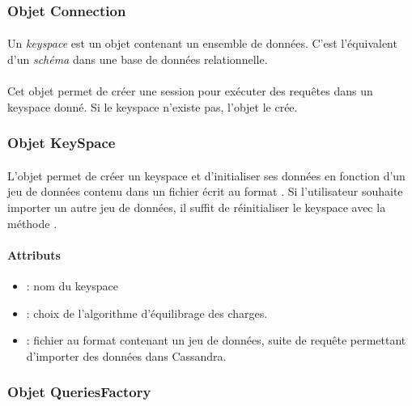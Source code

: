 \documentclass[12pt]{article}
\begin{document}
\subsubsection{ Objet Connection }

\paragraph{} Un \textit{keyspace} est un objet contenant un ensemble de données. C'est l'équivalent d'un \textit{schéma} dans une base de données relationnelle.

\paragraph{} Cet objet permet de créer une session pour exécuter des requêtes dans un keyspace donné.
Si le keyspace n'existe pas, l'objet  le crée.

\subsubsection{ Objet KeySpace }

\paragraph{} L'objet  permet de créer un keyspace et d'initialiser ses données en fonction d'un jeu de données contenu dans un fichier  écrit au format .
Si l'utilisateur souhaite importer un autre jeu de données, il suffit de réinitialiser le keyspace avec la méthode .

\paragraph{Attributs}
\begin{itemize}
 \item {} : nom du keyspace
 \item {} : choix de l'algorithme d'équilibrage des charges.
 \item {} : fichier au format  contenant un jeu de données, suite de requête permettant d'importer des données dans Cassandra.
\end{itemize}


\subsubsection{ Objet QueriesFactory }
\end{document}
